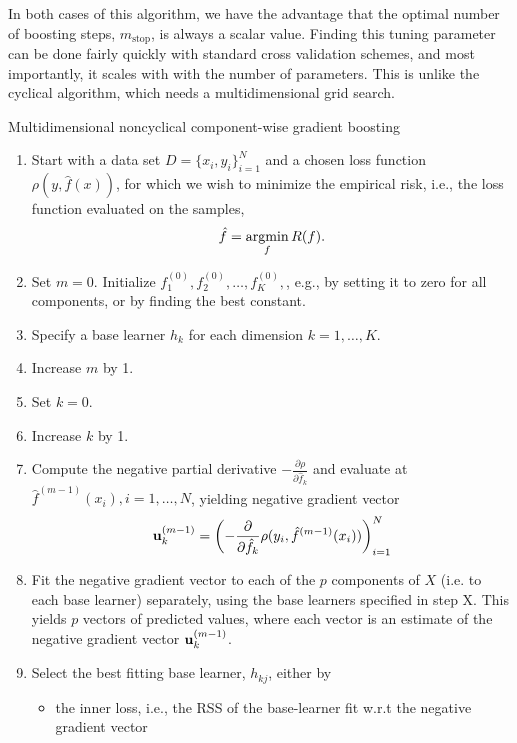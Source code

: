 In both cases of this algorithm, we have the advantage that the optimal number of boosting steps, $m_{\text{stop}}$, is always a scalar value. Finding this tuning parameter can be done fairly quickly with standard cross validation schemes, and most importantly, it scales with with the number of parameters. This is unlike the cyclical algorithm, which needs a multidimensional grid search.

\begin{algorithm}
\caption{Multidimensional noncyclical component-wise gradient boosting}
\label{algo:multi-noncyclical}
\begin{enumerate}
    \item Start with a data set $D=\{x_i, y_i\}_{i=1}^N$ and a chosen loss function $\rho(y,\hat{f}(x))$, for which we wish to
        minimize the empirical risk, i.e., the loss function evaluated on the samples,
        \begin{equation}
            \hat{f}=\operatorname*{argmin}_{f}R(f).
        \end{equation}
    \item Set $m=0$. Initialize $f^{(0)}_1,f^{(0)}_2,\ldots,f^{(0)}_K,$, e.g., by setting it to zero for all components, or by finding the best constant.%
    \item Specify a base learner $h_k$ for each dimension $k=1,\ldots,K$.
    \item Increase $m$ by 1.
    \item Set $k=0$.
    \item Increase $k$ by 1.
    \item Compute the negative partial derivative $-\frac{\partial\rho}{\partial \hat{f}_k}$
        and evaluate at $\hat{f}^{(m-1)}(x_i),i=1,\ldots,N$, yielding negative gradient vector
        \begin{equation}
            \mathbf{u}^{(m-1)}_k=\left(-\frac{\partial}{\partial \hat{f}_k}\rho(y_i, \hat{f}^{(m-1)}(x_i))\right)_{i=1}^N
        \end{equation}
    \item Fit the negative gradient vector to each of the $p$ components of $X$ (i.e. to each base learner) separately, using the base learners specified in step X. This yields $p$ vectors of predicted values, where each vector is an estimate of the negative gradient vector $\mathbf{u}^{(m-1)}_k$.
    \item Select the best fitting base learner, $h_{kj}$, either by
        \begin{itemize}
            \item the inner loss, i.e., the RSS of the base-learner fit w.r.t the negative gradient vector

\end{itemize}
\end{enumerate}
\end{algorithm}
